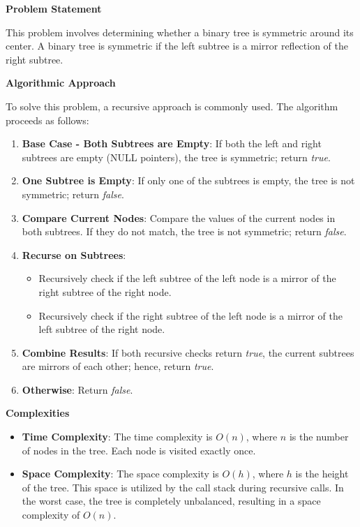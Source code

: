 

\textbf{Problem Statement}

This problem involves determining whether a binary tree is symmetric around its center. A binary tree is symmetric if the left subtree is a mirror reflection of the right subtree.

\textbf{Algorithmic Approach}

To solve this problem, a recursive approach is commonly used. The algorithm proceeds as follows:

\begin{enumerate}
    \item \textbf{Base Case - Both Subtrees are Empty}: If both the left and right subtrees are empty (NULL pointers), the tree is symmetric; return \textit{true}.
    \item \textbf{One Subtree is Empty}: If only one of the subtrees is empty, the tree is not symmetric; return \textit{false}.
    \item \textbf{Compare Current Nodes}: Compare the values of the current nodes in both subtrees. If they do not match, the tree is not symmetric; return \textit{false}.
    \item \textbf{Recurse on Subtrees}: 
    \begin{itemize}
        \item Recursively check if the left subtree of the left node is a mirror of the right subtree of the right node.
        \item Recursively check if the right subtree of the left node is a mirror of the left subtree of the right node.
    \end{itemize}
    \item \textbf{Combine Results}: If both recursive checks return \textit{true}, the current subtrees are mirrors of each other; hence, return \textit{true}.
    \item \textbf{Otherwise}: Return \textit{false}.
\end{enumerate}

\textbf{Complexities}

\begin{itemize}
    \item \textbf{Time Complexity}: The time complexity is \(O(n)\), where \(n\) is the number of nodes in the tree. Each node is visited exactly once.
    \item \textbf{Space Complexity}: The space complexity is \(O(h)\), where \(h\) is the height of the tree. This space is utilized by the call stack during recursive calls. In the worst case, the tree is completely unbalanced, resulting in a space complexity of \(O(n)\).
\end{itemize}

